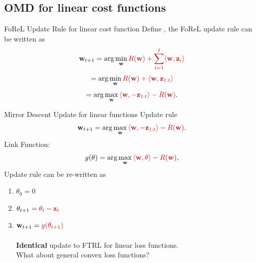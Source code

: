 \documentclass{beamer}
\begin{document}
\begin{small}
\subsection{OMD for linear cost functions}

\begin{frame}{FoReL Update Rule for linear cost function}
Define , the FoReL update rule can be written as
  \[
\mathbf{w}_{t+1} = \arg\min_{\mathbf{w}} \textcolor{mathcolor}{ R(\mathbf{w}) + \sum_{i=1}^{t} \langle \mathbf{w}, \mathbf{z}_i \rangle }
\]
\[
= \arg\min_{\mathbf{w}} \textcolor{mathcolor}{ R(\mathbf{w}) + \langle \mathbf{w}, \mathbf{z}_{1:t} \rangle }
\]
\[
= \arg\max_{\mathbf{w}} \textcolor{mathcolor}{ \langle \mathbf{w}, -\mathbf{z}_{1:t} \rangle - R(\mathbf{w}) }.
\]
\end{frame}

\begin{frame}{Mirror Descent Update for linear functions}
  Update rule
  \[
    \mathbf{w}_{t+1} = \arg\max_{\mathbf{w}} \textcolor{mathcolor}{ \langle \mathbf{w}, -\mathbf{z}_{1:t} \rangle - R(\mathbf{w}) }.
  \]
Link Function:
\[
g(\theta) = \arg\max_{\mathbf{w}} \textcolor{mathcolor}{ \langle \mathbf{w}, \theta \rangle - R(\mathbf{w}) },
\]
Update rule can be re-written as
\begin{enumerate}
  \item $\theta_0=0$
    \item \( \theta_{t+1} = \textcolor{mathcolor}{\theta_t - \mathbf{z}_t} \)
    \item \( \mathbf{w}_{t+1} = \textcolor{mathcolor}{g(\theta_{t+1})} \)\\
      ~\\ {\bf Identical} update to FTRL for linear loss functions.\\
      What about general convex loss functions?
    \end{enumerate}
    
\end{frame}


\end{small}
\end{document}
